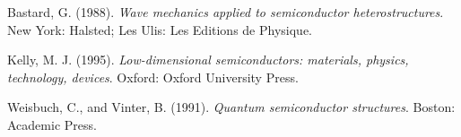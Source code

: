 \begin{thebibliography}{99}

Bastard, G. (1988).
\textit{Wave mechanics applied to semiconductor heterostructures}.
New York: Halsted; Les Ulis: Les Editions de Physique.

Kelly, M. J. (1995).
\textit{Low-dimensional semiconductors: materials, physics, technology, devices}.
Oxford: Oxford University Press.

Weisbuch, C., and Vinter, B. (1991).
\textit{Quantum semiconductor structures}.
Boston: Academic Press.

\end{thebibliography} 